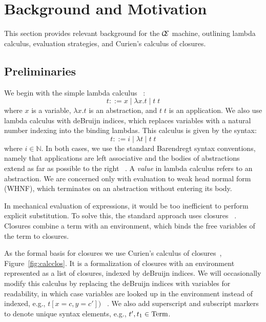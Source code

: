 \section{Background and Motivation} \label{sec:back}

This section provides relevant background for the $\mathcal{\mathcal{C} \mskip -4mu \mathcal{E}}$ machine,
outlining lambda calculus, evaluation strategies, and Curien's calculus of
closures.

\subsection{Preliminaries}

We begin with the simple lambda calculus ~\cite{barendregt1984lambda}:  $$ t::= x
\; | \;  \lambda x.t \; | \;  t \; t $$ where $x$ is a variable, $\lambda x.t$
is an abstraction, and $t \; t$ is an application. We also use lambda calculus
with deBruijn indices, which replaces variables with a natural number indexing
into the binding lambdas.  This calculus is given by the syntax: $$ t::= i \; |
\; \lambda t \; | \; t \; t $$ where $i \in \mathbb{N}$. In both cases, we use
the standard Barendregt syntax conventions, namely that applications are left
associative and the bodies of abstractions extend as far as possible to the
right ~\cite{barendregt1984lambda}.  A \emph{value} in lambda calculus refers to
an abstraction. We are concerned only with evaluation to weak head normal form
(WHNF), which terminates on an abstraction without entering its body.

In mechanical evaluation of expressions, it would be too inefficient to perform
explicit substitution. To solve this, the standard approach uses closures
~\cite{landin1964mechanical,curien1991abstract,jonesstg,biernacka2007concrete}.
Closures combine a term with an environment, which binds the free variables of
the term to closures. 

As the formal basis for closures we use Curien's calculus of
closures~\cite{curien1991abstract}, Figure~\ref{fig:calcclos}.  It is a
formalization of closures with an environment represented as a list of closures,
indexed by deBruijn indices. We will occasionally modify this calculus by
replacing the deBruijn indices with variables for readability, in which case
variables are looked up in the environment instead of indexed, e.g., $t[x = c, y
= c'])$ ~\cite{barendregt1984lambda}. We also add superscript and subscript
markers to denote unique syntax elements, e.g., $t', t_1 \in \textnormal{Term}$. 

